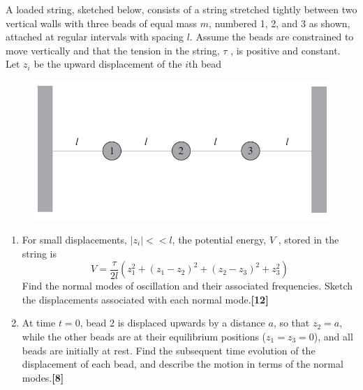 \documentclass[a4paper]{article}
\begin{document}
\begin{qns}
A loaded string, sketched below, consists of a string stretched tightly between two vertical walls with three beads of equal mass $m$, numbered 1, 2, and 3 as shown, attached at regular intervals with spacing $l$. Assume the beads are constrained to move vertically and that the tension in the string, $\tau$ , is positive and constant. Let $z_i$ be the upward displacement of the $i$th bead 
\begin{figure}[H]
    \centering
    \includegraphics[scale=0.35]{2014P2Q7.PNG}
\end{figure}
\begin{enumerate}[label=(\roman*)]
\item For small displacements, $|z_i|<< l$, the potential energy, $V$ , stored in the string is
$$V=\frac{\tau}{2l}(z_1^2+(z_1-z_2)^2+(z_2-z_3)^2+z_3^2)$$
Find the normal modes of oscillation and their associated frequencies. Sketch the displacements associated with each normal mode.\hfill\textbf{[12]}
\item At time $t = 0$, bead 2 is displaced upwards by a distance $a$, so that $z_2 = a$, while the other beads are at their equilibrium positions ($z_1 = z_3 = 0$), and all beads are initially at rest. Find the subsequent time evolution of the displacement of each bead, and describe the motion in terms of the normal modes.\hfill\textbf{[8]}
\end{enumerate}
\end{qns}
\end{document}
